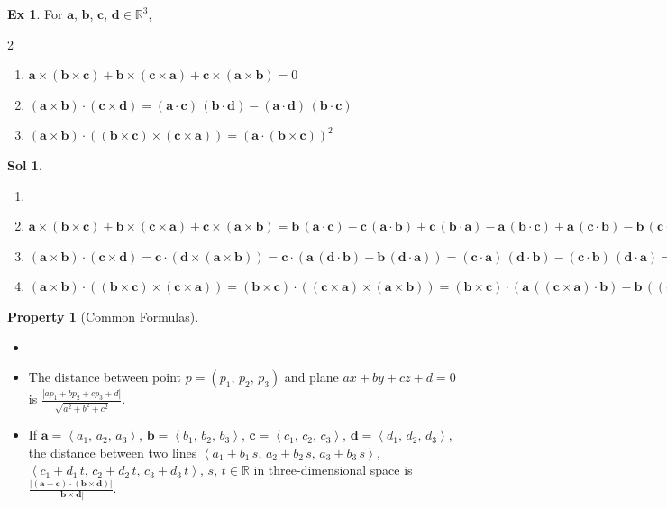 \documentclass[12pt]{extarticle}
\newcommand{\ds}{\displaystyle}
\newcommand{\llt}{\left\langle}
\newcommand{\rgt}{\right\rangle}
\theoremstyle{definition}
\newtheorem*{prp}{Property}
\newtheorem*{ex}{Ex}
\newtheorem*{sol}{Sol}
\newcommand{\va}{\mathbf{a}}
\newcommand{\vb}{\mathbf{b}}
\newcommand{\vc}{\mathbf{c}}
\newcommand{\vd}{\mathbf{d}}
\begin{document}
\begin{ex} For $\va$, $\vb$, $\vc$, $\vd\in\mathbb{R}^3$,
  \begin{multicols}{2}
    \begin{enumerate}\setlength{\itemsep}{0pt}
      \item $\va\times(\vb\times\vc) + \vb\times(\vc\times\va) + \vc\times(\va\times\vb) = 0$
      \item $(\va\times\vb)\cdot(\vc\times\vd) = (\va\cdot\vc)\,(\vb\cdot\vd) - (\va\cdot\vd)\,(\vb\cdot\vc)$
      \item $(\va\times\vb)\cdot\left((\vb\times\vc)\times(\vc\times\va) \right) = \left(\va\cdot(\vb\times\vc)\right)^2$
    \end{enumerate} 
  \end{multicols}
\end{ex}
\begin{sol}
  \begin{enumerate}\setlength{\itemsep}{0pt}
    \item[]
    \item $\va\times(\vb\times\vc) + \vb\times(\vc\times\va) + \vc\times(\va\times\vb) = \vb\,(\va\cdot\vc) - \vc\,(\va\cdot\vb) + \vc\,(\vb\cdot\va) - \va\,(\vb\cdot\vc) + \va\,(\vc\cdot\vb) - \vb\,(\vc\cdot\va) = 0$
    \item $(\va\times\vb)\cdot(\vc\times\vd) = \vc\cdot(\vd\times(\va\times\vb)) = \vc\cdot\left(\va\,(\vd\cdot\vb) - \vb\,(\vd\cdot\va)\right) = (\vc\cdot\va)\,(\vd\cdot\vb) - (\vc\cdot\vb)\,(\vd\cdot\va)  = (\va\cdot\vc)\,(\vb\cdot\vd) - (\va\cdot\vd)\,(\vb\cdot\vc)$
    \item $(\va\times\vb)\cdot\left((\vb\times\vc)\times(\vc\times\va)\right) = (\vb\times\vc)\cdot\left((\vc\times\va)\times(\va\times\vb)\right) = (\vb\times\vc)\cdot\left(\va\,\left((\vc\times\va)\cdot\vb\right) - \vb\,\left((\vc\times\va)\cdot\va\right)\right) = (\vb\times\vc)\cdot(\va\,\left((\vc\times\va)\cdot\vb\right)) = \left(\va\cdot(\vb\times\vc)\right)^2$
  \end{enumerate} 
\end{sol}

\begin{prp}[Common Formulas] 
  \begin{itemize}\setlength{\itemsep}{0pt}
    \item[]
    \item The distance between point $p = (p_1,\,p_2,\,p_3)$ and plane $ax + by + cz + d = 0$ is $\ds\frac{|a p_1 + b p_2 + c p_3 + d|}{\sqrt{a^2 + b^2 + c^2}}$. 
    \item If $\va = \llt a_1,\,a_2,\,a_3\rgt$, $\vb = \llt b_1,\,b_2,\,b_3\rgt$, $\vc = \llt c_1,\,c_2,\,c_3\rgt$, $\vd = \llt d_1,\,d_2,\,d_3\rgt$, the distance between two lines $\ds\llt a_1 + b_1\,s,\,a_2 + b_2\,s,\,a_3 + b_3\,s\rgt$, $\ds\llt c_1 + d_1\,t,\,c_2 + d_2\,t,\,c_3 + d_3\,t \rgt$, $s$, $t\in\mathbb{R}$ in three-dimensional space is $\ds\frac{|(\va - \vc)\cdot(\vb\times\vd)|}{|\vb\times\vd|}$. 
  \end{itemize}
\end{prp}
\end{document}
